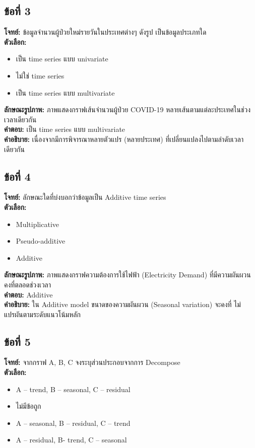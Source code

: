 \documentclass[12pt]{article}
\begin{document}
\subsection*{ข้อที่ 3}
\textbf{โจทย์:} ข้อมูลจำนวนผู้ป่วยใหม่รายวันในประเทศต่างๆ ดังรูป เป็นข้อมูลประเภทใด\\
\textbf{ตัวเลือก:}
\begin{itemize}
    \item เป็น time series แบบ univariate
    \item ไม่ใช่ time series
    \item เป็น time series แบบ multivariate
\end{itemize}

\textbf{ลักษณะรูปภาพ:} ภาพแสดงกราฟเส้นจำนวนผู้ป่วย COVID-19 หลายเส้นตามแต่ละประเทศในช่วงเวลาเดียวกัน\\
\textbf{คำตอบ:} เป็น time series แบบ multivariate\\
\textbf{คำอธิบาย:} เนื่องจากมีการพิจารณาหลายตัวแปร (หลายประเทศ) ที่เปลี่ยนแปลงไปตามลำดับเวลาเดียวกัน

\subsection*{ข้อที่ 4}
\textbf{โจทย์:} ลักษณะใดที่บ่งบอกว่าข้อมูลเป็น Additive time series\\
\textbf{ตัวเลือก:}
\begin{itemize}
    \item Multiplicative
    \item Pseudo-additive
    \item Additive
\end{itemize}

\textbf{ลักษณะรูปภาพ:} ภาพแสดงกราฟความต้องการใช้ไฟฟ้า (Electricity Demand) ที่มีความผันผวนคงที่ตลอดช่วงเวลา\\
\textbf{คำตอบ:} Additive\\
\textbf{คำอธิบาย:} ใน Additive model ขนาดของความผันผวน (Seasonal variation) จะคงที่ ไม่แปรผันตามระดับแนวโน้มหลัก

\subsection*{ข้อที่ 5}
\textbf{โจทย์:} จากกราฟ A, B, C จงระบุส่วนประกอบจากการ Decompose\\
\textbf{ตัวเลือก:}
\begin{itemize}
    \item A – trend, B – seasonal, C – residual
    \item ไม่มีข้อถูก
    \item A – seasonal, B – residual, C – trend
    \item A – residual, B- trend, C – seasonal
\end{itemize}
\end{document}
